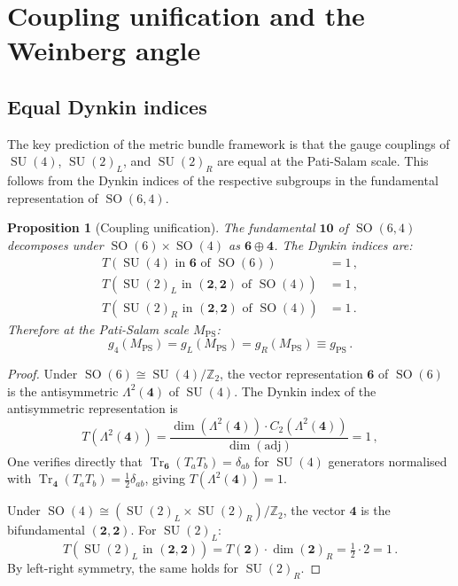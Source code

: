 \documentclass[12pt,a4paper]{article}
\newtheorem{proposition}[theorem]{Proposition}
\theoremstyle{definition}
\newcommand{\Tr}{\operatorname{Tr}}
\newcommand{\SO}{\operatorname{SO}}
\newcommand{\SU}{\operatorname{SU}}
\newcommand{\Z}{\mathbb{Z}}
\begin{document}
\section{Coupling unification and the Weinberg angle}
\label{sec:couplings}

\subsection{Equal Dynkin indices}

The key prediction of the metric bundle framework is that the gauge couplings of $\SU(4)$, $\SU(2)_L$, and $\SU(2)_R$ are equal at the Pati-Salam scale.
This follows from the Dynkin indices of the respective subgroups in the fundamental representation of $\SO(6,4)$.

\begin{proposition}[Coupling unification]
\label{prop:couplings}
The fundamental $\mathbf{10}$ of $\SO(6,4)$ decomposes under $\SO(6) \times \SO(4)$ as $\mathbf{6} \oplus \mathbf{4}$.
The Dynkin indices are:
\begin{align}
T(\SU(4) \text{ in } \mathbf{6} \text{ of } \SO(6)) &= 1\,,\\
T(\SU(2)_L \text{ in } (\mathbf{2},\mathbf{2}) \text{ of } \SO(4)) &= 1\,,\\
T(\SU(2)_R \text{ in } (\mathbf{2},\mathbf{2}) \text{ of } \SO(4)) &= 1\,.
\end{align}
Therefore at the Pati-Salam scale $M_{\mathrm{PS}}$:
\begin{equation}
\label{eq:coupling_unification}
g_4(M_{\mathrm{PS}}) = g_L(M_{\mathrm{PS}}) = g_R(M_{\mathrm{PS}}) \equiv g_{\mathrm{PS}}\,.
\end{equation}
\end{proposition}

\begin{proof}
Under $\SO(6) \cong \SU(4)/\Z_2$, the vector representation $\mathbf{6}$ of $\SO(6)$ is the antisymmetric $\Lambda^2(\mathbf{4})$ of $\SU(4)$.
The Dynkin index of the antisymmetric representation is
\[
T(\Lambda^2(\mathbf{4})) = \frac{\dim(\Lambda^2(\mathbf{4})) \cdot C_2(\Lambda^2(\mathbf{4}))}{\dim(\mathrm{adj})} = 1\,,
\]
One verifies directly that $\Tr_{\mathbf{6}}(T_a T_b) = \delta_{ab}$ for $\SU(4)$ generators normalised with $\Tr_{\mathbf{4}}(T_a T_b) = \tfrac{1}{2}\delta_{ab}$, giving $T(\Lambda^2(\mathbf{4})) = 1$.

Under $\SO(4) \cong (\SU(2)_L \times \SU(2)_R)/\Z_2$, the vector $\mathbf{4}$ is the bifundamental $(\mathbf{2},\mathbf{2})$.
For $\SU(2)_L$:
\[
T(\SU(2)_L \text{ in } (\mathbf{2},\mathbf{2})) = T(\mathbf{2}) \cdot \dim(\mathbf{2})_R = \tfrac{1}{2} \cdot 2 = 1\,.
\]
By left-right symmetry, the same holds for $\SU(2)_R$.
\end{proof}
\end{document}
